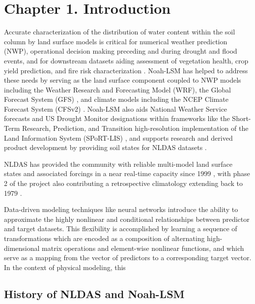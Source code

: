 
\chapter{Chapter 1. Introduction}%

Accurate characterization of the distribution of water content within the soil column by land surface models is critical for numerical weather prediction (NWP), operational decision making preceding and during drought and flood events, and for downstream datasets aiding assessment of vegetation health, crop yield prediction, and fire risk characterization \cite{koster_contribution_2010}\cite{otkin_assessing_2016}\cite{case_role_2023}. Noah-LSM has helped to address these needs by serving as the land surface component coupled to NWP models including the Weather Research and Forecasting Model (WRF), the Global Forecast System (GFS) \cite{jin_sensitivity_2010}\cite{mitchell_ncep_2005}, and climate models including the NCEP Climate Forecast System (CFSv2) \cite{saha_ncep_2014}. Noah-LSM also aids National Weather Service forecasts and US Drought Monitor designations within frameworks like the Short-Term Research, Prediction, and Transition high-resolution implementation of the Land Information System (SPoRT-LIS) \cite{case_nasa_2022}\cite{case_assessment_2014}, and supports research and derived product development by providing soil states for NLDAS datasets \cite{ek_implementation_2003}.

NLDAS has provided the community with reliable multi-model land surface states and associated forcings in a near real-time capacity since 1999 \cite{cosgrove_real-time_2003}, with phase 2 of the project also contributing a retrospective climatology extending back to 1979 \cite{xia_continental-scale_2012}.

Data-driven modeling techniques like neural networks introduce the ability to approximate the highly nonlinear and conditional relationships between predictor and target datasets. This flexibility is accomplished by learning a sequence of transformations which are encoded as a composition of alternating high-dimensional matrix operations and element-wise nonlinear functions, and which serve as a mapping from the vector of predictors to a corresponding target vector. In the context of physical modeling, this

\section{History of NLDAS and Noah-LSM}

